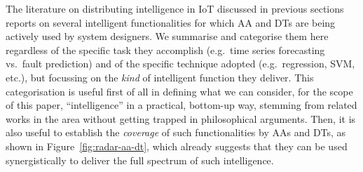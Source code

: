 The literature on distributing intelligence in IoT discussed in previous sections reports on several intelligent functionalities for which AA and DTs are being actively used by system designers. 
%
We summarise and categorise them here regardless of the specific task they accomplish (e.g.\ time series forecasting vs.\ fault prediction) and of the specific technique adopted (e.g.\ regression, SVM, etc.), but focussing on the \textit{kind} of intelligent function they deliver.
%
This categorisation is useful first of all in defining what we can consider, for the scope of this paper, ``intelligence'' in a practical, bottom-up way, stemming from related works in the area without getting trapped in philosophical arguments. 
%
Then, it is also useful to establish the \emph{coverage} of such functionalities by AAs and DTs, as shown in Figure~\ref{fig:radar-aa-dt}, which already suggests that they can be used synergistically to deliver the full spectrum of such intelligence. 
%
